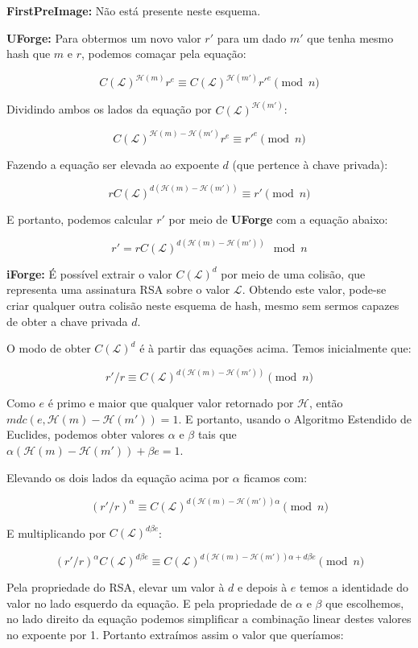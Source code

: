 \documentclass[a4paper]{article}
\begin{document}
\textbf{FirstPreImage:} Não está presente neste esquema.

\textbf{UForge:} Para obtermos um novo valor $r'$ para um dado $m'$
que tenha mesmo hash que $m$ e $r$, podemos comaçar pela equação:

$$
C(\mathcal{L})^{\mathcal{H}(m)}r^e \equiv C(\mathcal{L})^{\mathcal{H}(m')}r'^e \pmod n
$$

Dividindo ambos os lados da equação por $C(\mathcal{L})^{\mathcal{H}(m')}$:

$$
C(\mathcal{L})^{\mathcal{H}(m)-\mathcal{H}(m')}r^e \equiv r'^e \pmod n
$$

Fazendo a equação ser elevada ao expoente $d$ (que pertence à chave
privada):

$$
rC(\mathcal{L})^{d(\mathcal{H}(m)-\mathcal{H}(m'))} \equiv r' \pmod n
$$

E portanto, podemos calcular $r'$ por meio de \textbf{UForge} com a
equação abaixo:

$$
r' = rC(\mathcal{L})^{d(\mathcal{H}(m)-\mathcal{H}(m'))} \mod n
$$

\textbf{iForge:} É possível extrair o valor $C(\mathcal{L})^d$ por
meio de uma colisão, que representa uma assinatura RSA sobre o valor
$\mathcal{L}$. Obtendo este valor, pode-se criar qualquer outra
colisão neste esquema de hash, mesmo sem sermos capazes de obter a
chave privada $d$.

O modo de obter $C(\mathcal{L})^d$ é à partir das equações
acima. Temos inicialmente que:

$$
r'/r \equiv C(\mathcal{L})^{d(\mathcal{H}(m)-\mathcal{H}(m'))} \pmod n
$$

Como $e$ é primo e maior que qualquer valor retornado por
$\mathcal{H}$, então $mdc(e, \mathcal{H}(m)-\mathcal{H}(m')) = 1$. E
portanto, usando o Algoritmo Estendido de Euclides, podemos obter
valores $\alpha$ e $\beta$ tais que
$\alpha(\mathcal{H}(m)-\mathcal{H}(m'))+\beta e = 1$.

Elevando os dois lados da equação acima por $\alpha$ ficamos com:

$$
(r'/r)^\alpha \equiv C(\mathcal{L})^{d(\mathcal{H}(m)-\mathcal{H}(m'))\alpha} \pmod n
$$

E multiplicando por $C(\mathcal{L})^{d\beta e}$:

$$
(r'/r)^\alpha C(\mathcal{L})^{d\beta e} \equiv C(\mathcal{L})^{d(\mathcal{H}(m)-\mathcal{H}(m'))\alpha + d\beta e} \pmod n
$$

Pela propriedade do RSA, elevar um valor à $d$ e depois à $e$ temos a
identidade do valor no lado esquerdo da equação. E pela propriedade de
$\alpha$ e $\beta$ que escolhemos, no lado direito da equação podemos
simplificar a combinação linear destes valores no expoente por
1. Portanto extraímos assim o valor que queríamos:
\end{document}
